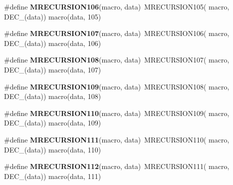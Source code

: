 \begin{DoxyCompactItemize}
\item 
\hypertarget{group__group__sam0__utils__mrecursion_gaddf3759d5e5b4aa3627ee44ea6e71cce}{}\#define {\bfseries M\+R\+E\+C\+U\+R\+S\+I\+O\+N106}(macro,  data)~M\+R\+E\+C\+U\+R\+S\+I\+O\+N105(  macro, D\+E\+C\+\_\+(data))   macro(data, 105)\label{group__group__sam0__utils__mrecursion_gaddf3759d5e5b4aa3627ee44ea6e71cce}

\item 
\hypertarget{group__group__sam0__utils__mrecursion_ga49eb823fe885fa9aee81242dc9265a4e}{}\#define {\bfseries M\+R\+E\+C\+U\+R\+S\+I\+O\+N107}(macro,  data)~M\+R\+E\+C\+U\+R\+S\+I\+O\+N106(  macro, D\+E\+C\+\_\+(data))   macro(data, 106)\label{group__group__sam0__utils__mrecursion_ga49eb823fe885fa9aee81242dc9265a4e}

\item 
\hypertarget{group__group__sam0__utils__mrecursion_gab36414caa07c8e1c5010b0715d72c018}{}\#define {\bfseries M\+R\+E\+C\+U\+R\+S\+I\+O\+N108}(macro,  data)~M\+R\+E\+C\+U\+R\+S\+I\+O\+N107(  macro, D\+E\+C\+\_\+(data))   macro(data, 107)\label{group__group__sam0__utils__mrecursion_gab36414caa07c8e1c5010b0715d72c018}

\item 
\hypertarget{group__group__sam0__utils__mrecursion_ga1f65b89088c75778a8e1a57272204963}{}\#define {\bfseries M\+R\+E\+C\+U\+R\+S\+I\+O\+N109}(macro,  data)~M\+R\+E\+C\+U\+R\+S\+I\+O\+N108(  macro, D\+E\+C\+\_\+(data))   macro(data, 108)\label{group__group__sam0__utils__mrecursion_ga1f65b89088c75778a8e1a57272204963}

\item 
\hypertarget{group__group__sam0__utils__mrecursion_ga6e8affd87de0ca5058d3864a21b71971}{}\#define {\bfseries M\+R\+E\+C\+U\+R\+S\+I\+O\+N110}(macro,  data)~M\+R\+E\+C\+U\+R\+S\+I\+O\+N109(  macro, D\+E\+C\+\_\+(data))   macro(data, 109)\label{group__group__sam0__utils__mrecursion_ga6e8affd87de0ca5058d3864a21b71971}

\item 
\hypertarget{group__group__sam0__utils__mrecursion_ga356438994d8a464952aacd98495045a3}{}\#define {\bfseries M\+R\+E\+C\+U\+R\+S\+I\+O\+N111}(macro,  data)~M\+R\+E\+C\+U\+R\+S\+I\+O\+N110(  macro, D\+E\+C\+\_\+(data))   macro(data, 110)\label{group__group__sam0__utils__mrecursion_ga356438994d8a464952aacd98495045a3}

\item 
\hypertarget{group__group__sam0__utils__mrecursion_ga37369c217da5a5c8941ba78d34202c40}{}\#define {\bfseries M\+R\+E\+C\+U\+R\+S\+I\+O\+N112}(macro,  data)~M\+R\+E\+C\+U\+R\+S\+I\+O\+N111(  macro, D\+E\+C\+\_\+(data))   macro(data, 111)\label{group__group__sam0__utils__mrecursion_ga37369c217da5a5c8941ba78d34202c40}


\end{DoxyCompactItemize}
